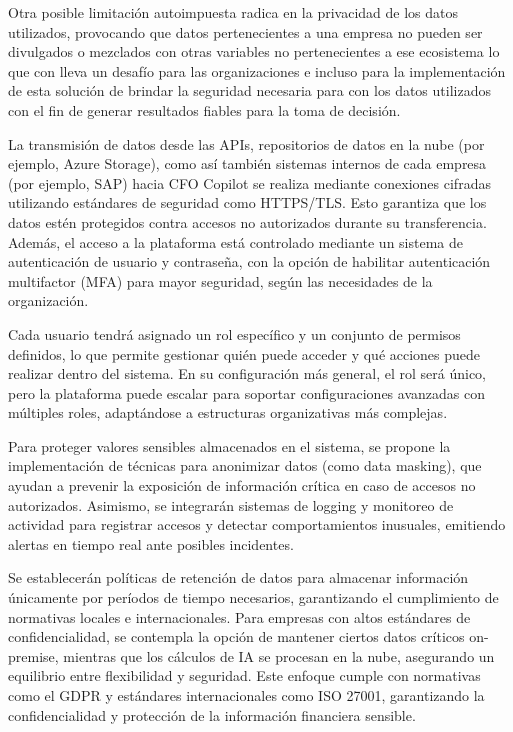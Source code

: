 \documentclass[12pt,letterpaper,oneside]{report}
\renewcommand{\_}{\UnderscoreOriginal\allowbreak}
\begin{document}
Otra posible limitación autoimpuesta radica en la privacidad de los datos utilizados, provocando que datos pertenecientes a una empresa no pueden ser divulgados o mezclados con otras variables no pertenecientes a ese ecosistema lo que con lleva un desafío para las organizaciones e incluso para la implementación de esta solución de brindar la seguridad necesaria para con los datos utilizados con el fin de generar resultados fiables para la toma de decisión. \parencite{Shabsigh2023}

La transmisión de datos desde las APIs, repositorios de datos en la nube (por ejemplo, Azure Storage), como así también sistemas internos de cada empresa (por ejemplo, SAP) hacia CFO Copilot se realiza mediante conexiones cifradas utilizando estándares de seguridad como HTTPS/TLS. Esto garantiza que los datos estén protegidos contra accesos no autorizados durante su transferencia. Además, el acceso a la plataforma está controlado mediante un sistema de autenticación de usuario y contraseña, con la opción de habilitar autenticación multifactor (MFA) para mayor seguridad, según las necesidades de la organización.

Cada usuario tendrá asignado un rol específico y un conjunto de permisos definidos, lo que permite gestionar quién puede acceder y qué acciones puede realizar dentro del sistema. En su configuración más general, el rol será único, pero la plataforma puede escalar para soportar configuraciones avanzadas con múltiples roles, adaptándose a estructuras organizativas más complejas.

Para proteger valores sensibles almacenados en el sistema, se propone la implementación de técnicas para anonimizar datos (como data masking), que ayudan a prevenir la exposición de información crítica en caso de accesos no autorizados. Asimismo, se integrarán sistemas de logging y monitoreo de actividad para registrar accesos y detectar comportamientos inusuales, emitiendo alertas en tiempo real ante posibles incidentes.

Se establecerán políticas de retención de datos para almacenar información únicamente por períodos de tiempo necesarios, garantizando el cumplimiento de normativas locales e internacionales. Para empresas con altos estándares de confidencialidad, se contempla la opción de mantener ciertos datos críticos on-premise, mientras que los cálculos de IA se procesan en la nube, asegurando un equilibrio entre flexibilidad y seguridad. Este enfoque cumple con normativas como el GDPR y estándares internacionales como ISO 27001, garantizando la confidencialidad y protección de la información financiera sensible.
\end{document}
